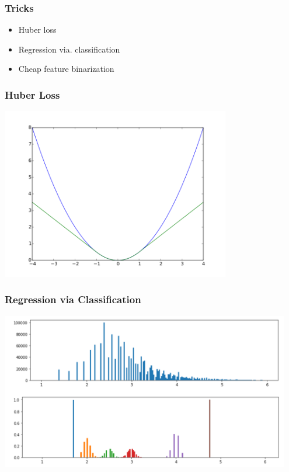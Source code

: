 \begin{frame}
    \frametitle{Tricks}

    \begin{itemize}
        \item Huber loss
        \item Regression via. classification
        \item Cheap feature binarization
    \end{itemize}

\end{frame}

\begin{frame}
    \frametitle{Huber Loss}

    \includegraphics[width=0.75\textwidth]{img/huber.png}

\end{frame}

\begin{frame}
    \frametitle{Regression via Classification}

    \includegraphics[width=0.95\textwidth]{img/regression_clf.png}

\end{frame}

